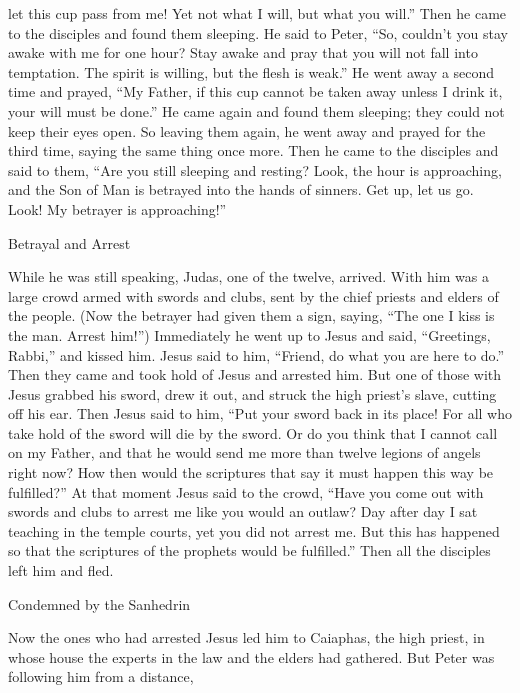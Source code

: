 {let this
cup
pass
from
me! Yet
not
what
I
will,
but
what
you will.”
Then
he came
to
the disciples
and
found
them
sleeping.
He
said
to Peter,
“So,
couldn’t
you stay awake
with
me
for one
hour?
Stay awake
and
pray
that
you will
not
fall
into
temptation.
The spirit
is willing,
but
the flesh
is weak.”
He went away
a second time
and prayed, “My
Father,
if
this
cup cannot
be taken away
unless
I drink
it,
your
will
must be done.”
He
came
again
and found
them
sleeping;
they
could not keep
their
eyes
open.
So
leaving
them
again,
he went away
and prayed
for
the third time,
saying
the same thing
once more.
Then
he came
to
the disciples
and
said
to them,
“Are you still sleeping
and
resting? Look,
the hour
is approaching,
and
the Son
of Man
is betrayed
into
the hands
of sinners.
Get up,
let us go.
Look! My
betrayer
is approaching!”
\par }{\SH Betrayal and Arrest
\par }{\PP {}While
he
was
still
speaking,
Judas,
one
of the twelve,
arrived.
With
him
was a large
crowd
armed with
swords
and
clubs,
sent by the chief priests
and
elders
of the people.
(Now
the betrayer
had given
them
a sign,
saying,
“The one
I kiss
is
the man.
Arrest
him!”)
Immediately
he went up
to Jesus
and said,
“Greetings,
Rabbi,”
and
kissed
him.
Jesus
said
to him,
“Friend,
do what you are here
to do.” Then
they came
and took hold
of
Jesus
and
arrested
him.
But
one
of those with
Jesus
grabbed
his
sword,
drew
it
out,
and
struck
the high priest’s
slave,
cutting off
his
ear.
Then
Jesus
said
to him,
“Put
your
sword
back
in
its
place! For
all
who take
hold of the sword
will die
by
the sword.
Or
do you think
that
I cannot
call
on my
Father,
and
that he would send
me
more than
twelve
legions
of angels
right now?
How
then
would the scriptures
that say it must
happen
this way
be fulfilled?”
At
that
moment
Jesus
said
to the crowd,
“Have you come out
with
swords
and
clubs
to arrest
me
like
you would an outlaw? Day after day
I sat
teaching
in
the temple courts,
yet
you did
not
arrest
me.
But
this
has happened
so
that the scriptures
of the prophets
would be fulfilled.”
Then
all
the disciples
left
him
and fled.
\par }{\SH Condemned by the Sanhedrin
\par }{\PP {}Now
the ones who had arrested
Jesus
led
him to
Caiaphas,
the high priest,
in whose house
the experts in the law
and
the elders
had gathered.
But
Peter
was following
him
from
a distance,
}
